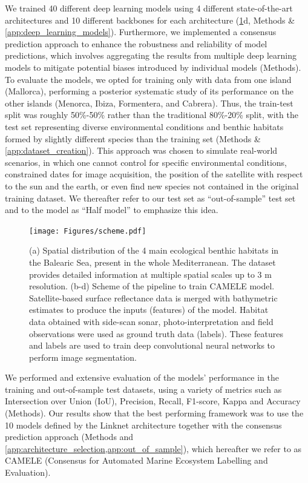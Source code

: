 We trained 40 different deep learning models using 4
different state-of-the-art architectures and 10 different backbones for each
architecture (\cref{fig:scheme}d, Methods \& \cref{app:deep_learning_models}).
Furthermore, we implemented a consensus prediction approach to enhance the
robustness and reliability of model predictions, which involves aggregating the
results from multiple deep learning models to mitigate potential biases
introduced by individual models (Methods). To evaluate the models, we opted for
training only with data from
one island (Mallorca), performing a posterior systematic study of its
performance on the other islands (Menorca, Ibiza, Formentera, and Cabrera).
Thus, the train-test split was roughly 50\%-50\% rather than the traditional
80\%-20\% split, with the test set representing diverse environmental
conditions and benthic habitats formed by slightly different species than
the training set (Methods \& \cref{app:dataset_creation}). This approach
was
chosen to simulate real-world scenarios, in which one cannot control for
specific environmental conditions, constrained dates for image acquisition, the
position of the satellite with respect to the sun and the earth, or even find
new species not contained in the original training dataset. We thereafter refer
to our test set as ``out-of-sample'' test set and to the model as ``Half
model'' to emphasize this idea.

\begin{figure}[H]
    \centering
    \texttt{[image: Figures/scheme.pdf]}
    \caption[AI framework for seagrass monitoring from satellite imagery]{(a)
        Spatial distribution of the
        4 main ecological
        benthic habitats
        in the Balearic Sea, present in the whole Mediterranean. The dataset
        provides
        detailed information at multiple spatial scales up to 3 m resolution.
        (b-d)
        Scheme of the pipeline to train CAMELE model. Satellite-based
        surface
        reflectance data is merged with bathymetric estimates to produce the
        inputs
        (features) of the model. Habitat data obtained with side-scan sonar,
        photo-interpretation and field observations were used as ground truth
        data
        (labels). These features and labels are used to train deep
        convolutional
        neural networks to perform image segmentation.}
    \label{fig:scheme}
\end{figure}

We performed and extensive evaluation of the models' performance in the
training and out-of-sample test datasets, using a variety of metrics such as
Intersection over Union (IoU), Precision, Recall, F1-score, Kappa and Accuracy
(Methods). Our results show that the best performing framework was to use the
10 models defined by the Linknet architecture together with the consensus
prediction approach (Methods and
\cref{app:architecture_selection,app:out_of_sample}), which
hereafter we
refer to as CAMELE (Consensus for Automated Marine Ecosystem Labelling and
Evaluation).

